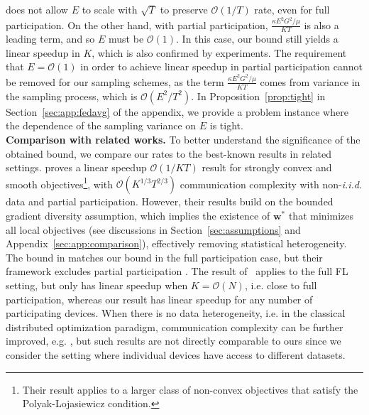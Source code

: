 does not allow $E$ to scale with $\sqrt{T}$ to preserve $\mathcal{O}(1/T)$
rate, even for full participation. On the other hand, with partial
participation, $\frac{\kappa E^{2}G^{2}/\mu}{KT}$ is also a leading
term, and so $E$ must be $\mathcal{O}(1)$. In this case, our bound
still yields a linear speedup in $K$, which is also confirmed by
experiments. {\color{red}The requirement that $E=\mathcal{O}(1)$ in order to achieve linear speedup in partial participation cannot be removed for our sampling schemes, as the term $\frac{\kappa E^{2}G^{2}/\mu}{KT}$ comes from variance in the sampling process, which is $\mathcal{O}(E^{2}/T^{2})$. In Proposition~\ref{prop:tight} in Section~\ref{sec:app:fedavg} of the appendix, we provide a problem instance where the dependence of the sampling variance on $E$ is tight.}  \\
\textbf{Comparison with related works.} To better understand the significance of the obtained bound, we compare our rates to the best-known results in related settings. \cite{haddadpour2019convergence} proves a linear speedup $\mathcal{O}(1/KT)$ result for strongly convex and smooth objectives\footnote{Their result applies to a larger class of non-convex objectives that satisfy the Polyak-Lojasiewicz condition.}, with $\mathcal{O}(K^{1/3}T^{2/3})$ communication complexity with non-\emph{i.i.d.} data and partial participation. However, their results build on the bounded gradient diversity assumption, which implies the existence of $\mathbf{w}^*$ that minimizes all local objectives (see discussions in Section~\ref{sec:assumptions} and Appendix~\ref{sec:app:comparison}), effectively removing statistical heterogeneity. The bound in \cite{koloskova2020unified} matches our bound in the full participation case, but their framework excludes partial participation \cite[Proposition 1]{koloskova2020unified}. The result of~\cite{karimireddy2019scaffold} applies to the full FL setting, but only has linear speedup when $K=\mathcal{O}(N)$, i.e. close to full participation, whereas our result has linear speedup for any number of participating devices. {\color{red}When there is no data heterogeneity, i.e. in the classical distributed optimization paradigm, communication complexity can be further improved, e.g. \cite{woodworth2020local,woodworth2020minibatch}, but such results are not directly comparable to ours since we consider the setting where individual devices have access to different datasets.}

\begin{comment}
	In this overparameterized setting, we prove a geometric convergence rate (see Section~\ref{sec:overparameterized}), 
	thus improving on the rate in \cite{haddadpour2019convergence} with
	better communication complexity. 
\end{comment}

